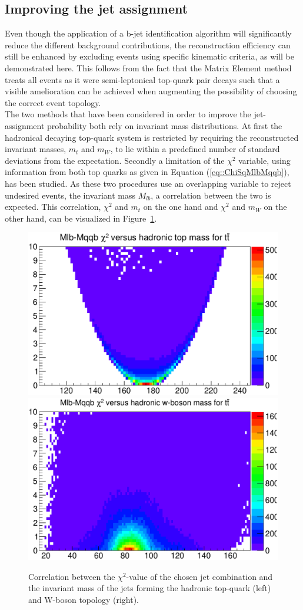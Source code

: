 \subsection{Improving the jet assignment}\label{subsec::MassCuts}
Even though the application of a b-jet identification algorithm will significantly reduce the different background contributions, the reconstruction efficiency can still be enhanced by excluding events using specific kinematic criteria, as will be demonstrated here.
This follows from the fact that the Matrix Element method treats all events as it were semi-leptonical top-quark pair decays such that a visible amelioration can be achieved when augmenting the possibility of choosing the correct event topology.
\\
The two methods that have been considered in order to improve the jet-assignment probability both rely on invariant mass distributions. %
At first the hadronical decaying top-quark system is restricted by requiring the reconstructed invariant masses, $m_t$ and $m_W$, to lie within a predefined number of standard deviations from the expectation. Secondly a limitation of the $\chi^{2}$ variable, using information from both top quarks as given in Equation (\ref{eq::ChiSqMlbMqqb}), has been studied.
As these two procedures use an overlapping variable to reject undesired events, the invariant mass $M_{lb}$, a correlation between the two is expected.
This correlation, $\chi^{2}$ and $m_{t}$ on the one hand and $\chi^{2}$ and $m_{W}$ on the other hand, can be visualized in Figure~\ref{fig::2Dexclusion}.

\begin{figure}[h!t]
 \centering
 \includegraphics[width = 0.45 \textwidth]{Chapters/Chapter4_EvtSel/Figures/MqqbVSChiSq.pdf} %
 \includegraphics[width = 0.45 \textwidth]{Chapters/Chapter4_EvtSel/Figures/MlbVSChiSq.pdf} %
 \caption{Correlation between the $\chi^{2}$-value of the chosen jet combination and the invariant mass of the jets forming the hadronic top-quark (left) and W-boson topology (right).} \label{fig::2Dexclusion}
\end{figure}

